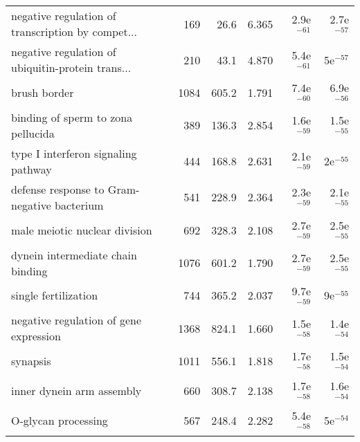 \begin{longtable}{lrrrrr}
 negative regulation of transcription by compet... &                     169 &                    26.6 &      6.365 &         2.9e$^{-61}$ &         2.7e$^{-57}$ \\
 negative regulation of ubiquitin-protein trans... &                     210 &                    43.1 &      4.870 &         5.4e$^{-61}$ &           5e$^{-57}$ \\
                                      brush border &                    1084 &                   605.2 &      1.791 &         7.4e$^{-60}$ &         6.9e$^{-56}$ \\
                binding of sperm to zona pellucida &                     389 &                   136.3 &      2.854 &         1.6e$^{-59}$ &         1.5e$^{-55}$ \\
               type I interferon signaling pathway &                     444 &                   168.8 &      2.631 &         2.1e$^{-59}$ &           2e$^{-55}$ \\
       defense response to Gram-negative bacterium &                     541 &                   228.9 &      2.364 &         2.3e$^{-59}$ &         2.1e$^{-55}$ \\
                     male meiotic nuclear division &                     692 &                   328.3 &      2.108 &         2.7e$^{-59}$ &         2.5e$^{-55}$ \\
                 dynein intermediate chain binding &                    1076 &                   601.2 &      1.790 &         2.7e$^{-59}$ &         2.5e$^{-55}$ \\
                              single fertilization &                     744 &                   365.2 &      2.037 &         9.7e$^{-59}$ &           9e$^{-55}$ \\
            negative regulation of gene expression &                    1368 &                   824.1 &      1.660 &         1.5e$^{-58}$ &         1.4e$^{-54}$ \\
                                          synapsis &                    1011 &                   556.1 &      1.818 &         1.7e$^{-58}$ &         1.5e$^{-54}$ \\
                         inner dynein arm assembly &                     660 &                   308.7 &      2.138 &         1.7e$^{-58}$ &         1.6e$^{-54}$ \\
                               O-glycan processing &                     567 &                   248.4 &      2.282 &         5.4e$^{-58}$ &           5e$^{-54}$ \\

\end{longtable}
